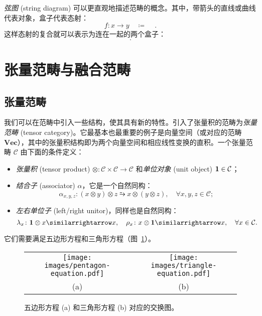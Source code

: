 \emph{弦图} (string diagram) 可以更直观地描述范畴的概念。其中，带箭头的直线或曲线代表对象，盒子代表态射：
\begin{equation}
  f\colon x\to y \quad \coloneq \quad
   \, .
\end{equation}
这样态射的复合就可以表示为连在一起的两个盒子：
\begin{equation}
  .
\end{equation}

\section{张量范畴与融合范畴}

\subsection{张量范畴}

我们可以在范畴中引入一些结构，使其具有新的特性。引入了张量积的范畴为\emph{张量范畴} (tensor category)。它最基本也最重要的例子是向量空间（或对应的范畴 $\mathbf{Vec}$），其中的张量积结构即为两个向量空间和相应线性变换的直积。一个张量范畴 $\mathcal{C}$ 由下面的条件定义：
\begin{itemize}
  \item \emph{张量积} (tensor product) $\otimes\colon\mathcal{C}\times\mathcal{C}\to\mathcal{C}$ 和\emph{单位对象} (unit object) $\mathbf{1}\in\mathcal{C}$；
  \item \emph{结合子} (associator) $\alpha$，它是一个自然同构：
    \begin{equation}
      \alpha_{x,y,z} \colon (x\otimes y)\otimes z \similarrightarrow x\otimes(y\otimes z), \quad \forall x,y,z \in \mathcal{C};
    \end{equation}
  \item \emph{左右单位子} (left/right unitor)，同样也是自然同构：
    \begin{equation}
      \lambda_x \colon \1\otimes x \similarrightarrow x, \quad
      \rho_x    \colon x\otimes\1  \similarrightarrow x, \quad
      \forall x \in \mathcal{C}.
    \end{equation}
\end{itemize}
它们需要满足五边形方程和三角形方程（图~\ref{fig:pentagon-triangle-equation}）。

\begin{figure}[htb]
  \centering
  \begin{tabular}{cc}
    \texttt{[image: images/pentagon-equation.pdf]} &
    \texttt{[image: images/triangle-equation.pdf]} \\
    (a) & (b)
  \end{tabular}
  \caption[五边形方程和三角形方程对应的交换图]{五边形方程 (a) 和三角形方程 (b) 对应的交换图。}
  \label{fig:pentagon-triangle-equation}
\end{figure}


